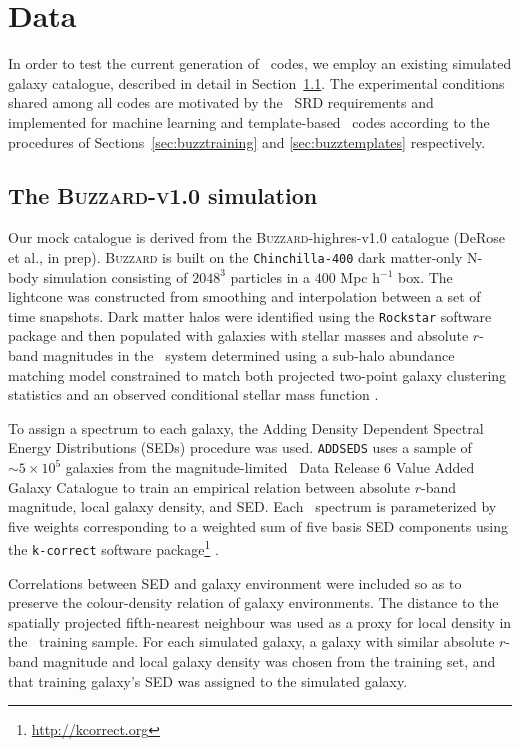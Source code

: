 \section{Data}
\label{sec:sims}

In order to test the current generation of \pzpdf\ codes, we employ an existing simulated galaxy catalogue, described in detail in Section~\ref{sec:buzzard}.
The experimental conditions shared among all codes are motivated by the \lsst\ SRD requirements and implemented for machine learning and template-based \pzpdf\ codes according to the procedures of Sections~\ref{sec:buzztraining} and \ref{sec:buzztemplates} respectively.

\subsection{The \textsc{Buzzard-v1.0} simulation}
\label{sec:buzzard}

Our mock catalogue is derived from the \textsc{Buzzard}-highres-v1.0 catalogue (DeRose et al., in prep).
\textsc{Buzzard} is built on the \texttt{Chinchilla-400} \citep{Mao:15} dark matter-only N-body simulation consisting of $2048^{3}$ particles in a $400$ Mpc h$^{-1}$ box.
The lightcone was constructed from smoothing and interpolation between a set of time snapshots.
Dark matter halos were identified using the \texttt{Rockstar} software package \citep{Behroozi:13} and then populated with galaxies with stellar masses and absolute $r$-band magnitudes in the \sdss\ system determined using a sub-halo abundance matching model constrained to match both projected two-point galaxy clustering statistics and an observed conditional stellar mass function \citep{Reddick:13}.

To assign a spectrum to each galaxy, the Adding Density Dependent Spectral Energy Distributions (SEDs) procedure \citep[\texttt{ADDSEDS,}][Wechsler et al., in prep,]{DeRose:19} was used.
\texttt{ADDSEDS} uses a sample of $\sim 5\times 10^{5}$ galaxies from the magnitude-limited \sdss\ Data Release 6 Value Added Galaxy Catalogue \citep[NYU-VAGC,][]{Blanton:05} to train an empirical relation between absolute $r$-band magnitude, local galaxy density, and SED.
Each \sdss\ spectrum is parameterized by five weights corresponding to a weighted sum of five basis SED components using the \texttt{k-correct} software package\footnote{\url{http://kcorrect.org}} \citep{Blanton:07}.

Correlations between SED and galaxy environment were included so as to preserve the colour-density relation of galaxy environments.
The distance to the spatially projected fifth-nearest neighbour was used as a proxy for local density in the \sdss\ training sample.
For each simulated galaxy, a galaxy with similar absolute $r$-band magnitude and local galaxy density was chosen from the training set, and that training galaxy's SED was assigned to the simulated galaxy.

